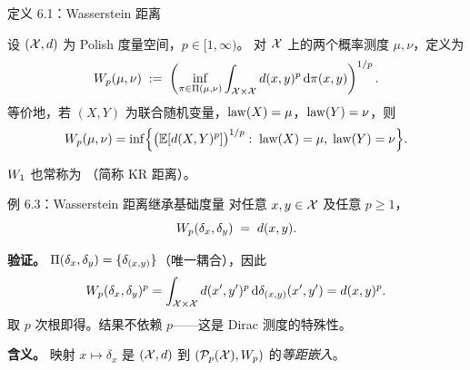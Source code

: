 \begin{frame}{定义 6.1：Wasserstein 距离}

  设 $(\mathcal{X},d)$ 为 Polish 度量空间，$p\in[1,\infty)$。
  对 $\mathcal{X}$ 上的两个概率测度 $\mu,\nu$，定义为
  \[
    W_{p}(\mu,\nu) \;:=\;
    \left(\inf_{\pi\in\Pi(\mu,\nu)} \int_{\mathcal{X}\times\mathcal{X}} d(x,y)^{p}\,\mathrm{d}\pi(x,y)\right)^{1/p}.
  \]
  等价地，若 $(X,Y)$ 为联合随机变量，$\operatorname{law}(X)=\mu$，$\operatorname{law}(Y)=\nu$，则
  \[
    W_{p}(\mu,\nu)
    = \inf\Bigl\{\bigl(\mathbb{E}[d(X,Y)^{p}]\bigr)^{1/p}:\;
      \operatorname{law}(X)=\mu,\;\operatorname{law}(Y)=\nu\Bigr\}.
  \]

  $W_{1}$ 也常称为 （简称 KR 距离）。

\end{frame}

\begin{frame}{例 6.3：Wasserstein 距离继承基础度量}
  对任意 $x,y\in\mathcal{X}$ 及任意 $p\ge1$，
  \[
    W_{p}(\delta_{x},\delta_{y}) \;=\; d(x,y).
  \]

  \textbf{验证。} $\Pi(\delta_{x},\delta_{y})=\{\delta_{(x,y)}\}$（唯一耦合），因此
  \[
    W_{p}(\delta_{x},\delta_{y})^{p}
    = \int_{\mathcal{X}\times\mathcal{X}} d(x',y')^{p}\,\mathrm{d}\delta_{(x,y)}(x',y')
    = d(x,y)^{p}.
  \]
  取 $p$ 次根即得。结果不依赖 $p$——这是 Dirac 测度的特殊性。

  \textbf{含义。} 映射 $x\mapsto\delta_{x}$ 是 $(\mathcal{X},d)$ 到 $(\mathcal{P}_{p}(\mathcal{X}),W_{p})$ 的\emph{等距嵌入}。

\end{frame}

